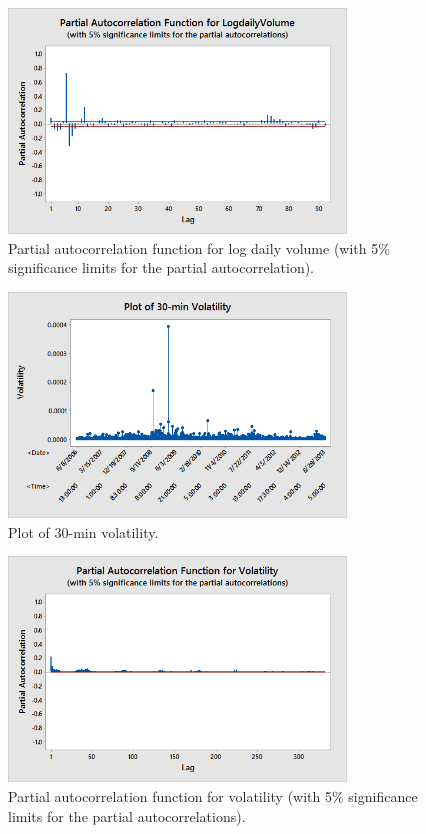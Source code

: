 \begin{figure}[!ht]
   \centering
    \includegraphics[width=0.8\textwidth]{chapters/chapter_stat_ts/figures/logdaily.png}
   \caption{Partial autocorrelation function for log daily volume (with 5\% significance limits for the partial autocorrelation). \label{fig:logdailyvolume}}
\end{figure}

\begin{figure}[!ht]
   \centering
    \includegraphics[width=0.8\textwidth]{chapters/chapter_stat_ts/figures/30min.png}
   \caption{Plot of 30-min volatility. \label{fig:30min}}
\end{figure}


\begin{figure}[!ht]
   \centering
    \includegraphics[width=0.8\textwidth]{chapters/chapter_stat_ts/figures/funvol.png}
   \caption{Partial autocorrelation function for volatility (with 5\% significance limits for the partial autocorrelations). \label{fig:funvol}}
\end{figure}

